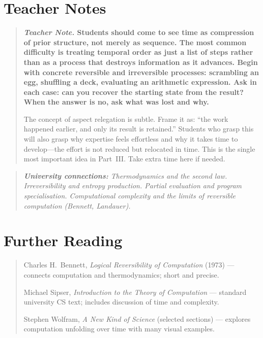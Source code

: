 \documentclass[11pt]{book}
\theoremstyle{plain}
\theoremstyle{definition}
\theoremstyle{remark}
\newenvironment{teachernote}
  {\begin{quote}\small\bfseries\textit{Teacher Note.}\normalfont\small\enspace\ignorespaces}
  {\end{quote}}
\newenvironment{universitybridge}
  {\begin{quote}\small\itshape\textbf{University connections:}\normalfont\small\itshape\enspace\ignorespaces}
  {\end{quote}}
\newenvironment{readinglist}
  {\begin{quote}\small}
  {\end{quote}}
\begin{document}
\section*{Teacher Notes}

\begin{teachernote}
Students should come to see time as compression of prior structure, not
merely as sequence. The most common difficulty is treating temporal order
as just a list of steps rather than as a process that destroys
information as it advances. Begin with concrete reversible and
irreversible processes: scrambling an egg, shuffling a deck, evaluating
an arithmetic expression. Ask in each case: can you recover the starting
state from the result? When the answer is no, ask what was lost and why.

The concept of aspect relegation is subtle. Frame it as: ``the work
happened earlier, and only its result is retained.'' Students who grasp
this will also grasp why expertise feels effortless and why it takes time
to develop---the effort is not reduced but relocated in time. This is the
single most important idea in Part~III. Take extra time here if needed.
\end{teachernote}

\begin{universitybridge}
Thermodynamics and the second law. Irreversibility and entropy
production. Partial evaluation and program specialisation. Computational
complexity and the limits of reversible computation (Bennett, Landauer).
\end{universitybridge}

\section*{Further Reading}

\begin{readinglist}
Charles H.~Bennett, \textit{Logical Reversibility of Computation}
(1973) --- connects computation and thermodynamics; short and precise.

Michael Sipser, \textit{Introduction to the Theory of Computation}
--- standard university CS text; includes discussion of time and
complexity.

Stephen Wolfram, \textit{A New Kind of Science} (selected sections)
--- explores computation unfolding over time with many visual examples.
\end{readinglist}
\end{document}
